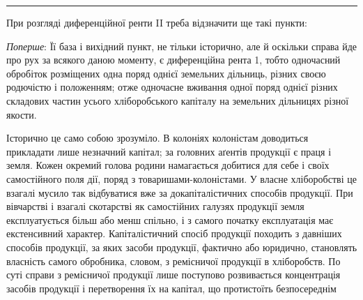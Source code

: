 \pfbreak

При розгляді диференційної ренти II треба відзначити ще такі пункти:

\emph{Поперше}: Її база і вихідний пункт, не тільки історично, але й оскільки
справа йде про рух за всякого даною моменту, є диференційна рента 1, тобто
одночасний обробіток розміщених одна поряд однієї земельних дільниць, різних
своєю родючістю і положенням; отже одночасне вживання одної поряд однієї
різних складових частин усього хліборобського капіталу на земельних дільницях
різної якости.

Історично це само собою зрозуміло. В колоніях колоністам доводиться прикладати
лише незначний капітал; за головних аґентів продукції є праця і земля.
Кожен окремий голова родини намагається добитися для себе і своїх самостійного
поля дії, поряд з товаришами-колоністами. У власне хліборобстві це
взагалі мусило так відбуватися вже за докапіталістичних способів продукції. При
вівчарстві і взагалі скотарстві як самостійних галузях продукції земля експлуатується
більш або менш спільно, і з самого початку експлуатація має екстенсивний
характер. Капіталістичний спосіб продукції походить з давніших способів
продукції, за яких засоби продукції, фактично або юридично, становлять
власність самого обробника, словом, з ремісничої продукції в хліборобств. По
суті справи з ремісничої продукції лише поступово розвивається концентрація
засобів продукції і перетворення їх на капітал, що протистоїть безпосереднім
\parbreak{}  %
